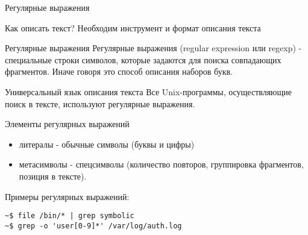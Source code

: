 \begin{frame}{Регулярные выражения}

  \begin{block}{Как описать текст?}
    Необходим инструмент и формат описания текста
  \end{block} \pause

  \begin{block}{Регулярные выражения}
    \alert{Регулярные выражения (regular expression или regexp)} -  специальные строки символов, которые задаются для поиска совпадающих фрагментов. Иначе говоря это способ описания наборов букв.
  \end{block} \pause

  \begin{block}{Универсальный язык описания текста}
    Все Unix-программы, осуществляющие поиск в тексте, используют регулярные выражения.
  \end{block}

\end{frame}

\begin{frame}[fragile]{Элементы регулярных выражений}
    \begin{itemize}
      \item \alert{литералы} - обычные символы (буквы и цифры) \pause
      \item \alert{метасимволы} - спецсимволы (количество повторов, группировка фрагментов, позиция в тексте).
    \end{itemize} \pause

    Примеры регулярных выражений:\newline
\begin{lstlisting}
~$ file /bin/* | grep symbolic
~$ grep -o 'user[0-9]*' /var/log/auth.log
\end{lstlisting}
\end{frame}

